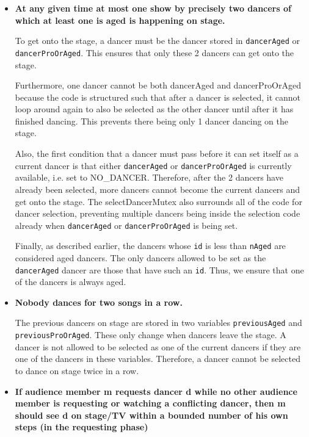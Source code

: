 \documentclass[12pt,a4paper]{scrartcl}
\begin{document}
\begin{itemize}
    \item {\bf At any given time at most one show by precisely two dancers of which at least one is aged is happening on stage.}

To get onto the stage, a dancer must be the dancer stored in \texttt{dancerAged} or \texttt{dancerProOrAged}. This ensures that only these 2 dancers can get onto the stage. 

Furthermore, one dancer cannot be both dancerAged and dancerProOrAged because the code is structured such that after a dancer is selected, it cannot loop around again to also be selected as the other dancer until after it has finished dancing. This prevents there being only 1 dancer dancing on the stage.

Also, the first condition that a dancer must pass before it can set itself as a current dancer is that either \texttt{dancerAged} or \texttt{dancerProOrAged} is currently available, i.e. set to NO\_DANCER. Therefore, after the 2 dancers have already been selected, more dancers cannot become the current dancers and get onto the stage. The selectDancerMutex also surrounds all of the code for dancer selection, preventing multiple dancers being inside the selection code already when \texttt{dancerAged} or \texttt{dancerProOrAged} is being set.

Finally, as described earlier, the dancers whose \texttt{id} is less than \texttt{nAged} are considered aged dancers. The only dancers allowed to be set as the \texttt{dancerAged} dancer are those that have such an \texttt{id}. Thus, we ensure that one of the dancers is always aged.

    \item {\bf Nobody dances for two songs in a row.}

The previous dancers on stage are stored in two variables \texttt{previousAged} and \texttt{previousProOrAged}. These only change when dancers leave the stage. A dancer is not allowed to be selected as one of the current dancers if they are one of the dancers in these variables. Therefore, a dancer cannot be selected to dance on stage twice in a row.

    \item {\bf If audience member m requests dancer d while no other audience member is requesting or watching a conflicting dancer, then m should see d on stage/TV within a bounded number of his own steps (in the requesting phase)}


\end{itemize}
\end{document}
